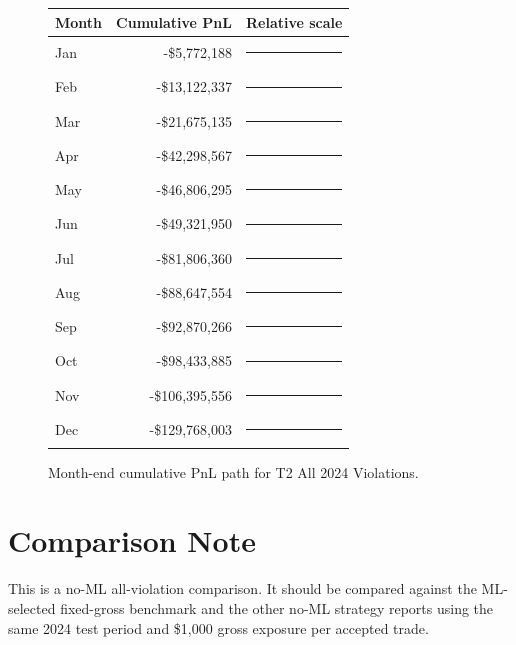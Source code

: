 \documentclass[11pt]{article}
\begin{document}
\begin{figure}[h]
\centering
\begin{tabular}{@{}lrl@{}}
\toprule
Month & Cumulative PnL & Relative scale \\
\midrule
Jan & -\$5,772,188 & \textcolor{red}{\rule{0.4cm}{7pt}}\\
Feb & -\$13,122,337 & \textcolor{red}{\rule{1.0cm}{7pt}}\\
Mar & -\$21,675,135 & \textcolor{red}{\rule{1.7cm}{7pt}}\\
Apr & -\$42,298,567 & \textcolor{red}{\rule{3.3cm}{7pt}}\\
May & -\$46,806,295 & \textcolor{red}{\rule{3.6cm}{7pt}}\\
Jun & -\$49,321,950 & \textcolor{red}{\rule{3.8cm}{7pt}}\\
Jul & -\$81,806,360 & \textcolor{red}{\rule{6.3cm}{7pt}}\\
Aug & -\$88,647,554 & \textcolor{red}{\rule{6.8cm}{7pt}}\\
Sep & -\$92,870,266 & \textcolor{red}{\rule{7.2cm}{7pt}}\\
Oct & -\$98,433,885 & \textcolor{red}{\rule{7.6cm}{7pt}}\\
Nov & -\$106,395,556 & \textcolor{red}{\rule{8.2cm}{7pt}}\\
Dec & -\$129,768,003 & \textcolor{red}{\rule{10.0cm}{7pt}}\\
\bottomrule
\end{tabular}
\caption{Month-end cumulative PnL path for T2 All 2024 Violations.}
\end{figure}

\section{Comparison Note}

This is a no-ML all-violation comparison. It should be compared against the ML-selected fixed-gross benchmark and the other no-ML strategy reports using the same 2024 test period and \$1,000 gross exposure per accepted trade.
\end{document}
